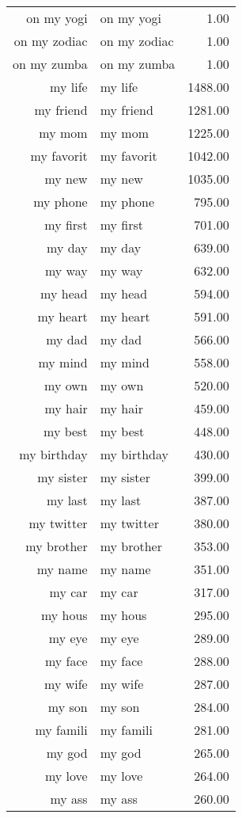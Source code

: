 \begin{table}[ht]
\begin{tabular}{rlr}
  on my yogi & on my yogi & 1.00 \\ 
  on my zodiac & on my zodiac & 1.00 \\ 
  on my zumba & on my zumba & 1.00 \\ 
  my life & my life & 1488.00 \\ 
  my friend & my friend & 1281.00 \\ 
  my mom & my mom & 1225.00 \\ 
  my favorit & my favorit & 1042.00 \\ 
  my new & my new & 1035.00 \\ 
  my phone & my phone & 795.00 \\ 
  my first & my first & 701.00 \\ 
  my day & my day & 639.00 \\ 
  my way & my way & 632.00 \\ 
  my head & my head & 594.00 \\ 
  my heart & my heart & 591.00 \\ 
  my dad & my dad & 566.00 \\ 
  my mind & my mind & 558.00 \\ 
  my own & my own & 520.00 \\ 
  my hair & my hair & 459.00 \\ 
  my best & my best & 448.00 \\ 
  my birthday & my birthday & 430.00 \\ 
  my sister & my sister & 399.00 \\ 
  my last & my last & 387.00 \\ 
  my twitter & my twitter & 380.00 \\ 
  my brother & my brother & 353.00 \\ 
  my name & my name & 351.00 \\ 
  my car & my car & 317.00 \\ 
  my hous & my hous & 295.00 \\ 
  my eye & my eye & 289.00 \\ 
  my face & my face & 288.00 \\ 
  my wife & my wife & 287.00 \\ 
  my son & my son & 284.00 \\ 
  my famili & my famili & 281.00 \\ 
  my god & my god & 265.00 \\ 
  my love & my love & 264.00 \\ 
  my ass & my ass & 260.00 \\ 

\end{tabular}
\end{table}
